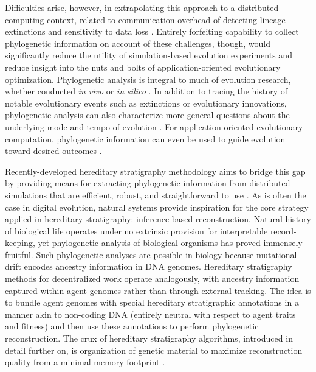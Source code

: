 Difficulties arise, however, in extrapolating this approach to a distributed computing context, related to communication overhead of detecting lineage extinctions and sensitivity to data loss \citep{moreno2024algorithms}.
Entirely forfeiting capability to collect phylogenetic information on account of these challenges, though, would significantly reduce the utility of simulation-based evolution experiments and reduce insight into the nuts and bolts of application-oriented evolutionary optimization.
Phylogenetic analysis is integral to much of evolution research, whether conducted \textit{in vivo} or \textit{in silico} \citep{faithConservationEvaluationPhylogenetic1992, STAMATAKIS2005phylogenetics,frenchHostPhylogenyShapes2023,kim2006discovery,lewinsohnStatedependentEvolutionaryModels2023a,lenski2003evolutionary}.
In addition to tracing the history of notable evolutionary events such as extinctions or evolutionary innovations, phylogenetic analysis can also characterize more general questions about the underlying mode and tempo of evolution \citep{moreno2023toward,hernandez2022can,shahbandegan2022untangling,lewinsohnStatedependentEvolutionaryModels2023a}.
For application-oriented evolutionary computation, phylogenetic information can even be used to guide evolution toward desired outcomes \citep{lalejini2024phylogeny,lalejini2024runtime,murphy2008simple,burke2003increased}.

Recently-developed hereditary stratigraphy methodology aims to bridge this gap by providing means for extracting phylogenetic information from distributed simulations that are efficient, robust, and straightforward to use \citep{moreno2022hereditary}.
As is often the case in digital evolution, natural systems provide inspiration for the core strategy applied in hereditary stratigraphy: inference-based reconstruction.
Natural history of biological life operates under no extrinsic provision for interpretable record-keeping, yet phylogenetic analysis of biological organisms has proved immensely fruitful.
Such phylogenetic analyses are possible in biology because mutational drift encodes ancestry information in DNA genomes.
Hereditary stratigraphy methods for decentralized work operate analogously, with ancestry information captured within agent genomes rather than through external tracking.
The idea is to bundle agent genomes with special hereditary stratigraphic annotations in a manner akin to non-coding DNA (entirely neutral with respect to agent traits and fitness) and then use these annotations to perform phylogenetic reconstruction.
The crux of hereditary stratigraphy algorithms, introduced in detail further on, is organization of genetic material to maximize reconstruction quality from a minimal memory footprint \citep{moreno2022hereditary}.


